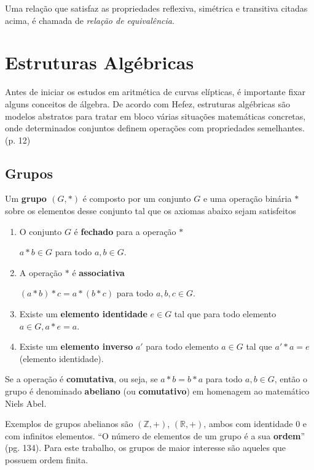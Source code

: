 Uma relação que satisfaz as propriedades reflexiva, simétrica e transitiva citadas acima, é chamada de \textit{relação de equivalência}\cite{Domingues:2003}.


%
%
\section{Estruturas Algébricas}

Antes de iniciar os estudos em aritmética de curvas elípticas, é importante
fixar alguns conceitos de álgebra. De acordo com Hefez, estruturas algébricas são modelos abstratos para tratar em bloco várias situações matemáticas concretas, onde determinados conjuntos definem operações com propriedades semelhantes. \cite{Hefez:2008} (p. 12)

%
%
\subsection{Grupos}

Um \textbf{grupo \((G,*)\)} é composto por um conjunto \(G\) e uma operação binária \(*\) sobre os elementos desse conjunto tal que os axiomas abaixo sejam satisfeitos \cite{Gilbert:2004}

\begin{enumerate}
\item O conjunto \(G\) é \textbf{fechado} para a operação \(*\)

$a * b \in G$ para todo $a,b \in G$.

\item A operação $*$ é \textbf{associativa}

$(a * b) * c = a * (b * c)$ para todo $a,b,c \in G$.

\item Existe um \textbf{elemento identidade} $e \in G$ tal que para todo elemento $a \in G, a * e = a$.
\item Existe um \textbf{elemento inverso} \(a'\) para todo elemento $a \in G$ tal que $a' * a = e$ (elemento identidade).
\end{enumerate}

Se a operação é \textbf{comutativa}, ou seja, se $a * b = b * a$ para todo $a, b \in G$, então o grupo é denominado \textbf{abeliano} (ou \textbf{comutativo}) em homenagem ao matemático Niels Abel. \cite{Gilbert:2004}

Exemplos de grupos abelianos são $(\mathds{Z}, +)$, $(\mathds{R}, +)$, ambos com identidade 0 e com infinitos elementos. ``O número de elementos de um grupo é a sua \textbf{ordem}'' \cite{Coutinho:2014} (pg. 134). Para este trabalho, os grupos de maior interesse são aqueles que possuem ordem finita.

